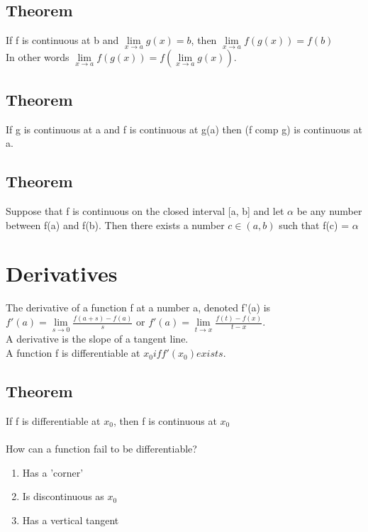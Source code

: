 \documentclass{article}
\begin{document}
\subsection{Theorem}
If f is continuous at b and $\lim\limits_{x\to a} g(x)=b$, then $\lim\limits_{x\to a} f(g(x)) = f(b)$ \\
In other words $\lim\limits_{x\to a}f(g(x)) = f(\lim\limits_{x\to a}g(x))$.

\subsection{Theorem}
If g is continuous at a and f is continuous at g(a) then (f comp g) is continuous at a.
\subsection{Theorem}
Suppose that f is continuous on the closed interval [a, b] and let $\alpha$ be any number between f(a) and f(b). Then there exists a number $c\in (a, b)$ such that f(c) = $\alpha$
\section{Derivatives}
The derivative of a function f at a number a, denoted f'(a) is $f'(a) = \lim\limits_{s\to 0} \frac{f(a + s)- f(a)}{s}$ or $f'(a) = \lim\limits_{t\to x} \frac{f(t)- f(x)}{t-x}$.
\\
A derivative is the slope of a tangent line. \\
A function f is differentiable at $x_0 if f'(x_0) exists$.
\subsection{Theorem}
If f is differentiable at $x_0$, then f is continuous at $x_0$
\\ \\
How can a function fail to be differentiable?
\begin{enumerate}
	\item Has a 'corner'
	\item Is discontinuous as $x_0$
	\item Has a vertical tangent
\end{enumerate} 
 
 
\end{document}
